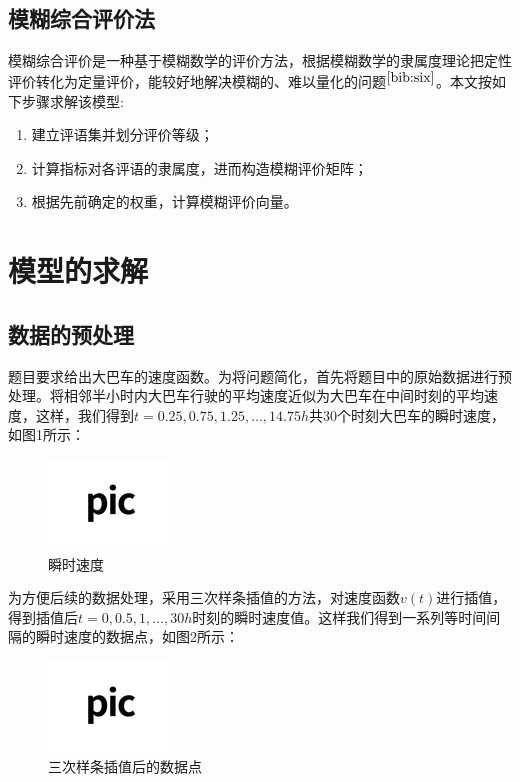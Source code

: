 \documentclass[bwprint]{cumcmthesis}
\begin{document}
        \subsection{模糊综合评价法}
        模糊综合评价是一种基于模糊数学的评价方法，根据模糊数学的隶属度理论把定性评价转化为定量评价，能较好地解决模糊的、难以量化的问题$^{\cite{bib:six}}$。本文按如下步骤求解该模型:
        \begin{enumerate}
            \item 建立评语集并划分评价等级；
            \item 计算指标对各评语的隶属度，进而构造模糊评价矩阵；
            \item 根据先前确定的权重，计算模糊评价向量。
        \end{enumerate}
    \section{模型的求解}
        \subsection{数据的预处理}
        题目要求给出大巴车的速度函数。为将问题简化，首先将题目中的原始数据进行预处理。将相邻半小时内大巴车行驶的平均速度近似为大巴车在中间时刻的平均速度，这样，我们得到$t=0.25, 0.75, 1.25,\dots, 14.75h$共$30$个时刻大巴车的瞬时速度，如图1所示：
        \begin{figure}[htbp]
            \centering
            \includegraphics[width=0.5\linewidth]{test.jpg}
            \caption{瞬时速度}
        \end{figure}
            
        为方便后续的数据处理，采用三次样条插值的方法，对速度函数$v(t)$进行插值，得到插值后$t=0, 0.5, 1,\dots, 30h$时刻的瞬时速度值。这样我们得到一系列等时间间隔的瞬时速度的数据点，如图2所示：
        \begin{figure}[htbp]
            \centering
            \includegraphics[width=0.5\linewidth]{test.jpg}
            \caption{三次样条插值后的数据点}
        \end{figure}
        
\end{document}
